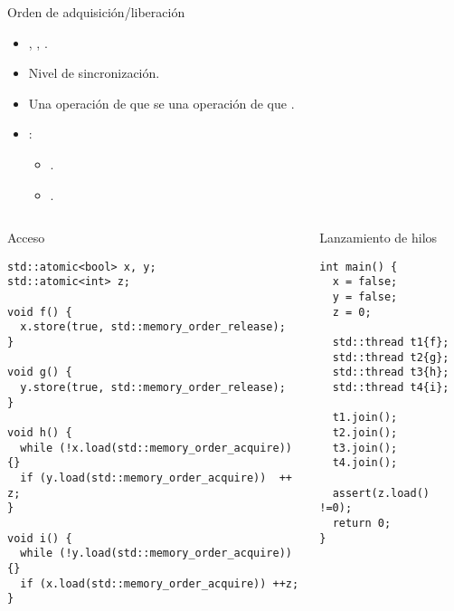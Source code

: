 \begin{frame}[t]{Orden de adquisición/liberación}
\begin{itemize}
  \item {}, , .
  
  \item Nivel  de sincronización.
  
  \item Una operación de  que  
        se  una operación de  que .
  
  \item {}:
    \begin{itemize}
      \item {}.
      \item {}.
    \end{itemize}
\end{itemize}
\end{frame}


\begin{frame}[t,fragile]
\begin{columns}

\begin{column}{.6\textwidth}
\begin{block}{Acceso}
\begin{lstlisting}
std::atomic<bool> x, y;
std::atomic<int> z;

void f() {
  x.store(true, std::memory_order_release);
}

void g() {
  y.store(true, std::memory_order_release);
}

void h() {
  while (!x.load(std::memory_order_acquire)) {}
  if (y.load(std::memory_order_acquire))  ++ z;
}

void i() {
  while (!y.load(std::memory_order_acquire)) {}
  if (x.load(std::memory_order_acquire)) ++z;
}
\end{lstlisting}
\end{block}
\end{column}

\begin{column}{.4\textwidth}
\begin{block}{Lanzamiento de hilos}
\begin{lstlisting}
int main() {
  x = false;
  y = false;
  z = 0;

  std::thread t1{f};
  std::thread t2{g};
  std::thread t3{h};
  std::thread t4{i};

  t1.join();
  t2.join();
  t3.join();
  t4.join();

  assert(z.load() !=0);
  return 0;
}
\end{lstlisting}
\end{block}
\end{column}

\end{columns}
\end{frame}

